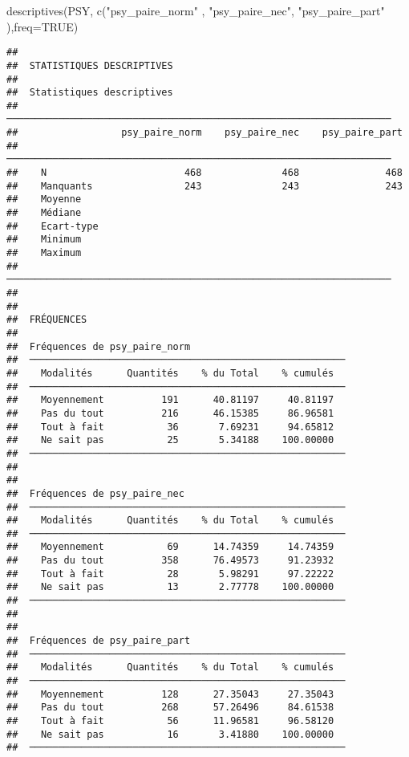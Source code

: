 \documentclass[
]{article}
\newenvironment{Shaded}{\begin{snugshade}}{\end{snugshade}}
\newcommand{\AttributeTok}[1]{\textcolor[rgb]{0.77,0.63,0.00}{#1}}
\newcommand{\ConstantTok}[1]{\textcolor[rgb]{0.00,0.00,0.00}{#1}}
\newcommand{\FunctionTok}[1]{\textcolor[rgb]{0.00,0.00,0.00}{#1}}
\newcommand{\NormalTok}[1]{#1}
\newcommand{\StringTok}[1]{\textcolor[rgb]{0.31,0.60,0.02}{#1}}
\begin{document}
\begin{Shaded}
\begin{Highlighting}[]
\FunctionTok{descriptives}\NormalTok{(PSY, }\FunctionTok{c}\NormalTok{(}\StringTok{"psy\_paire\_norm"}\NormalTok{ , }\StringTok{"psy\_paire\_nec"}\NormalTok{,  }\StringTok{"psy\_paire\_part"}\NormalTok{ ),}\AttributeTok{freq=}\ConstantTok{TRUE}\NormalTok{)}
\end{Highlighting}
\end{Shaded}

\begin{verbatim}
## 
##  STATISTIQUES DESCRIPTIVES
## 
##  Statistiques descriptives                                           
##  ─────────────────────────────────────────────────────────────────── 
##                  psy_paire_norm    psy_paire_nec    psy_paire_part   
##  ─────────────────────────────────────────────────────────────────── 
##    N                        468              468               468   
##    Manquants                243              243               243   
##    Moyenne                                                           
##    Médiane                                                           
##    Ecart-type                                                        
##    Minimum                                                           
##    Maximum                                                           
##  ─────────────────────────────────────────────────────────────────── 
## 
## 
##  FRÉQUENCES
## 
##  Fréquences de psy_paire_norm                            
##  ─────────────────────────────────────────────────────── 
##    Modalités      Quantités    % du Total    % cumulés   
##  ─────────────────────────────────────────────────────── 
##    Moyennement          191      40.81197     40.81197   
##    Pas du tout          216      46.15385     86.96581   
##    Tout à fait           36       7.69231     94.65812   
##    Ne sait pas           25       5.34188    100.00000   
##  ─────────────────────────────────────────────────────── 
## 
## 
##  Fréquences de psy_paire_nec                             
##  ─────────────────────────────────────────────────────── 
##    Modalités      Quantités    % du Total    % cumulés   
##  ─────────────────────────────────────────────────────── 
##    Moyennement           69      14.74359     14.74359   
##    Pas du tout          358      76.49573     91.23932   
##    Tout à fait           28       5.98291     97.22222   
##    Ne sait pas           13       2.77778    100.00000   
##  ─────────────────────────────────────────────────────── 
## 
## 
##  Fréquences de psy_paire_part                            
##  ─────────────────────────────────────────────────────── 
##    Modalités      Quantités    % du Total    % cumulés   
##  ─────────────────────────────────────────────────────── 
##    Moyennement          128      27.35043     27.35043   
##    Pas du tout          268      57.26496     84.61538   
##    Tout à fait           56      11.96581     96.58120   
##    Ne sait pas           16       3.41880    100.00000   
##  ───────────────────────────────────────────────────────
\end{verbatim}
\end{document}
